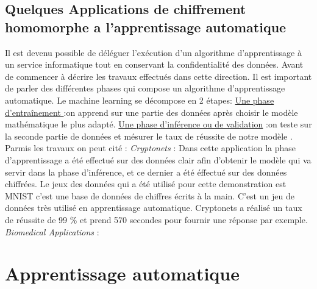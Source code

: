 \documentclass[a4paper,11pt]{report}
\begin{document}
\subsection{Quelques Applications de chiffrement homomorphe a l'apprentissage automatique}
Il est devenu possible de déléguer l'exécution d'un algorithme d'apprentissage à un service informatique tout en conservant la confidentialité des données. \newline
Avant de commencer à décrire les travaux effectués dans cette direction. Il est important de parler des différentes phases qui compose un algorithme d'apprentissage automatique.\newline
Le machine learning se décompose en 2 étapes:\newline
\underline{Une phase d’entraînement }:\newline on apprend sur une partie des données après choisir le modèle mathématique le plus adapté.\newline 
\underline{Une phase d'inférence ou de validation} :\newline	 on teste sur la seconde partie de données et mésurer le taux de réussite de notre modèle .\newline
Parmis les travaux on peut cité :\newline
\textit{Cryptonets } :  \newline
Dans cette application la phase d'apprentissage a été effectué sur des données clair  afin d'obtenir le modèle qui va servir dans la phase d'inférence, et ce dernier a été éffectué sur des données chiffrées.\newline
Le jeux des données qui a été utilisé pour cette demonstration est MNIST c'est une base de données de chiffres écrits à la main. C'est un jeu de données très utilisé en apprentissage automatique.\newline
Cryptonets a réalisé un taux de réussite de 99 \% et prend 570 secondes pour fournir une réponse par exemple.\newline
\textit{Biomedical Applications } :
\newpage
\newpage
\section{Apprentissage automatique}
\end{document}
